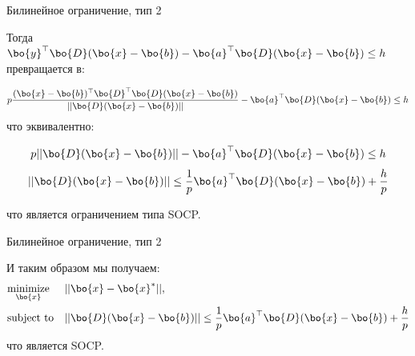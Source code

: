 \documentclass{beamer}
\begin{document}
\begin{frame}{Билинейное ограничение, тип 2}
	\begin{flushleft}
		
		Тогда $\bo{y}^\top \bo{D} (\bo{x} - \bo{b}) - \bo{a}^\top \bo{D} (\bo{x} - \bo{b}) \leq h$ превращается в:
		
		\begin{equation}
			p \frac{ (\bo{x} - \bo{b})^\top \bo{D}^\top \bo{D} (\bo{x} - \bo{b}) }{|| \bo{D} (\bo{x} - \bo{b}) ||}  - \bo{a}^\top \bo{D} (\bo{x} - \bo{b}) \leq h
		\end{equation}
		что эквивалентно:
		
		\begin{equation}
			p || \bo{D} (\bo{x} - \bo{b}) || - \bo{a}^\top \bo{D} (\bo{x} - \bo{b}) \leq h
		\end{equation}
		\begin{equation}
			|| \bo{D} (\bo{x} - \bo{b}) ||  \leq \frac{1}{p}\bo{a}^\top \bo{D} (\bo{x} - \bo{b}) + \frac{h}{p}
		\end{equation}
		
		что является ограничением типа SOCP.
		
	\end{flushleft}
\end{frame}

\begin{frame}{Билинейное ограничение, тип 2}
	\begin{flushleft}
		
		И таким образом мы получаем:
		\begin{equation}
			\begin{aligned}
				& \underset{\bo{x}}{\text{minimize}}
				& & ||\bo{x} - \bo{x}^*||, \\
				& \text{subject to}
				& & || \bo{D} (\bo{x} - \bo{b}) ||  \leq \frac{1}{p}\bo{a}^\top \bo{D} (\bo{x} - \bo{b}) + \frac{h}{p}
			\end{aligned}
		\end{equation}
		что является SOCP. 
		
	\end{flushleft}
\end{frame}
\end{document}
